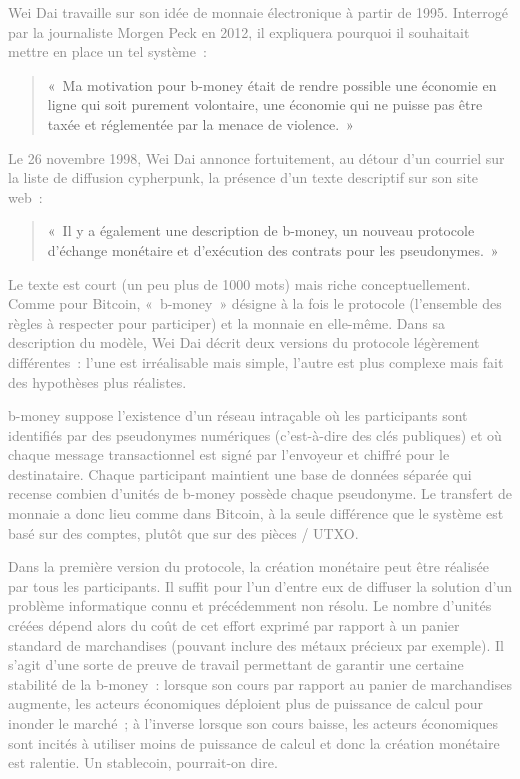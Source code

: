 \textcolor{gray}{Wei Dai travaille sur son idée de monnaie électronique à partir de 1995. Interrogé par la journaliste Morgen Peck en 2012, il expliquera pourquoi il souhaitait mettre en place un tel système~:}

\begin{quote}
«~Ma motivation pour b-money était de rendre possible une économie en ligne qui soit purement volontaire, une économie qui ne puisse pas être taxée et réglementée par la menace de violence.~»
\end{quote}

\textcolor{gray}{Le 26 novembre 1998, Wei Dai annonce fortuitement, au détour d'un courriel sur la liste de diffusion cypherpunk, la présence d'un texte descriptif sur son site web~:}

\begin{quote}
«~Il y a également une description de b-money, un nouveau protocole d'échange monétaire et d'exécution des contrats pour les pseudonymes.~»
\end{quote}

\textcolor{gray}{Le texte est court (un peu plus de 1000 mots) mais riche conceptuellement. Comme pour Bitcoin, «~b-money~» désigne à la fois le protocole (l'ensemble des règles à respecter pour participer) et la monnaie en elle-même. Dans sa description du modèle, Wei Dai décrit deux versions du protocole légèrement différentes~: l'une est irréalisable mais simple, l'autre est plus complexe mais fait des hypothèses plus réalistes.}

\textcolor{gray}{b-money suppose l'existence d'un réseau intraçable où les participants sont identifiés par des pseudonymes numériques (c'est-à-dire des clés publiques) et où chaque message transactionnel est signé par l'envoyeur et chiffré pour le destinataire. Chaque participant maintient une base de données séparée qui recense combien d'unités de b-money possède chaque pseudonyme. Le transfert de monnaie a donc lieu comme dans Bitcoin, à la seule différence que le système est basé sur des comptes, plutôt que sur des pièces / UTXO.}

\textcolor{gray}{Dans la première version du protocole, la création monétaire peut être réalisée par tous les participants. Il suffit pour l'un d'entre eux de diffuser la solution d'un problème informatique connu et précédemment non résolu. Le nombre d'unités créées dépend alors du coût de cet effort exprimé par rapport à un panier standard de marchandises (pouvant inclure des métaux précieux par exemple). Il s'agit d'une sorte de preuve de travail permettant de garantir une certaine stabilité de la b-money~: lorsque son cours par rapport au panier de marchandises augmente, les acteurs économiques déploient plus de puissance de calcul pour inonder le marché~; à l'inverse lorsque son cours baisse, les acteurs économiques sont incités à utiliser moins de puissance de calcul et donc la création monétaire est ralentie. Un stablecoin, pourrait-on dire.}

